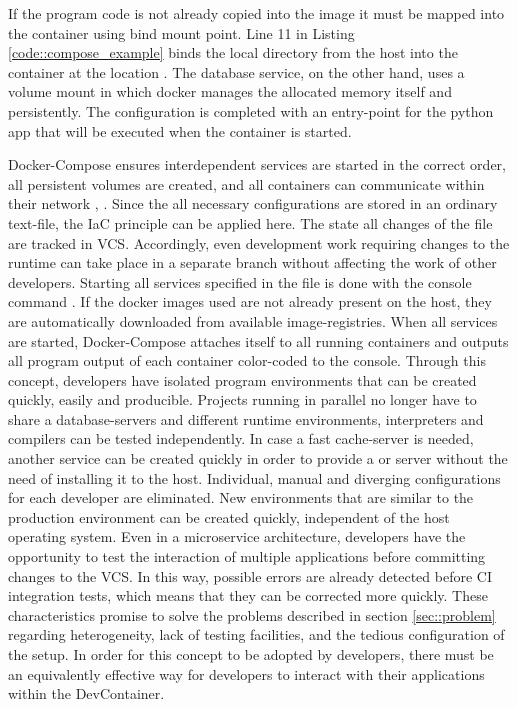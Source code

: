         If the program code is not already copied into the image it must be mapped into the container using bind mount point. Line 11 in Listing \ref{code::compose_example} binds the local  directory from the host into the container at the location . The database service, on the other hand, uses a volume mount in which docker manages the allocated memory itself and persistently. The configuration is completed with an entry-point for the python app that will be executed when the container is started.\newline
        
        Docker-Compose ensures interdependent services are started in the correct order, all persistent volumes are created, and all containers can communicate within their network \cite{docker2020}, \cite{dockerdocs}. Since the all necessary configurations are stored in an ordinary text-file, the \ac{IaC} principle can be applied here. The state all changes of the  file are tracked in \ac{VCS}. Accordingly, even development work requiring changes to the runtime can take place in a separate branch without affecting the work of other developers.\newline
        Starting all services specified in the  file is done with the console command . If the docker images used are not already present on the host, they are automatically downloaded from available image-registries. When all services are started, Docker-Compose attaches itself to all running containers and outputs all program output of each container color-coded to the console.\newline
        Through this concept, developers have isolated program environments that can be created quickly, easily and producible. Projects running in parallel no longer have to share a database-servers and different runtime environments, interpreters and compilers can be tested independently. In case a fast cache-server is needed, another service can be created quickly in order to provide a  or  server without the need of installing it to the host. Individual, manual and diverging configurations for each developer are eliminated. New environments that are similar to the production environment can be created quickly, independent of the host operating system. Even in a microservice architecture, developers have the opportunity to test the interaction of multiple applications before committing changes to the \ac{VCS}. In this way, possible errors are already detected before CI integration tests, which means that they can be corrected more quickly. These characteristics promise to solve the problems described in section \ref{sec::problem} regarding heterogeneity, lack of testing facilities, and the tedious configuration of the setup. In order for this concept to be adopted by developers, there must be an equivalently effective way for developers to interact with their applications within the DevContainer.

